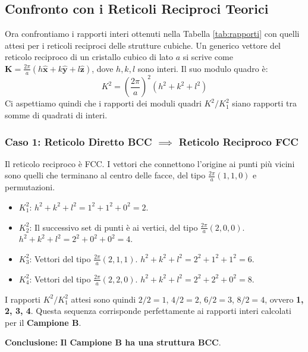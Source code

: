 \subsection{Confronto con i Reticoli Reciproci Teorici}

Ora confrontiamo i rapporti interi ottenuti nella Tabella \ref{tab:rapporti} con quelli attesi per i reticoli reciproci delle strutture cubiche. Un generico vettore del reticolo reciproco di un cristallo cubico di lato $a$ si scrive come $\mathbf{K} = \frac{2\pi}{a}(h\mathbf{\hat{x}} + k\mathbf{\hat{y}} + l\mathbf{\hat{z}})$, dove $h,k,l$ sono interi. Il suo modulo quadro è:
$$ K^2 = \left(\frac{2\pi}{a}\right)^2 (h^2+k^2+l^2) $$
Ci aspettiamo quindi che i rapporti dei moduli quadri $K^2/K_1^2$ siano rapporti tra somme di quadrati di interi.

\subsubsection{Caso 1: Reticolo Diretto BCC $\implies$ Reticolo Reciproco FCC}
Il reticolo reciproco è FCC. I vettori che connettono l'origine ai punti più vicini sono quelli che terminano al centro delle facce, del tipo $\frac{2\pi}{a}(1,1,0)$ e permutazioni.
\begin{itemize}
    \item $K_1^2$: $h^2+k^2+l^2 = 1^2+1^2+0^2 = 2$.
    \item $K_2^2$: Il successivo set di punti è ai vertici, del tipo $\frac{2\pi}{a}(2,0,0)$. $h^2+k^2+l^2 = 2^2+0^2+0^2 = 4$.
    \item $K_3^2$: Vettori del tipo $\frac{2\pi}{a}(2,1,1)$. $h^2+k^2+l^2 = 2^2+1^2+1^2 = 6$.
    \item $K_4^2$: Vettori del tipo $\frac{2\pi}{a}(2,2,0)$. $h^2+k^2+l^2 = 2^2+2^2+0^2 = 8$.
\end{itemize}
I rapporti $K^2/K_1^2$ attesi sono quindi $2/2=1$, $4/2=2$, $6/2=3$, $8/2=4$, ovvero \textbf{1, 2, 3, 4}.
Questa sequenza corrisponde perfettamente ai rapporti interi calcolati per il \textbf{Campione B}.

\textbf{Conclusione:} \textbf{Il Campione B ha una struttura BCC}.

